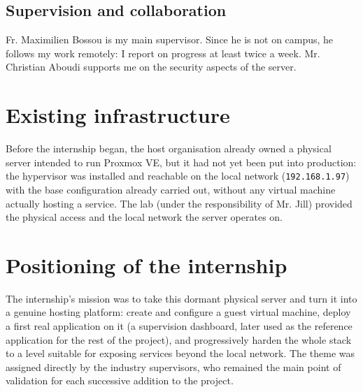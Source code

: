 \subsection{Supervision and collaboration}
Fr. Maximilien Bossou is my main supervisor. Since he is not on campus, he follows my work remotely: I report on progress at least twice a week. Mr. Christian Aboudi supports me on the security aspects of the server.

\section{Existing infrastructure}
Before the internship began, the host organisation already owned a physical server intended to run Proxmox VE, but it had not yet been put into production: the hypervisor was installed and reachable on the local network (\texttt{192.168.1.97}) with the base configuration already carried out, without any virtual machine actually hosting a service. The lab (under the responsibility of Mr. Jill) provided the physical access and the local network the server operates on.

\section{Positioning of the internship}
The internship's mission was to take this dormant physical server and turn it into a genuine hosting platform: create and configure a guest virtual machine, deploy a first real application on it (a supervision dashboard, later used as the reference application for the rest of the project), and progressively harden the whole stack to a level suitable for exposing services beyond the local network. The theme was assigned directly by the industry supervisors, who remained the main point of validation for each successive addition to the project.

\clearpage
